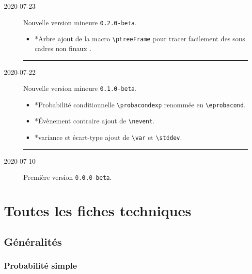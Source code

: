 \documentclass[12pt,a4paper]{article}
\makeatletter
\newcommand\env[1]{\texttt{#1}}
\newcommand\macro[1]{\env{\textbackslash{}#1}}
\theoremstyle{definition}
\newcommand\separation{
	\medskip
	\hfill\rule{0.5\textwidth}{0.75pt}\hfill
	\medskip
}
\newcommand\topic{\@ifstar{\@topic@star}{\@topic@no@star}}
\newcommand\@topic@no@star[1]{%
	\textbf{\textsc{#1}.}%
}
\newcommand\@topic@star[1]{%
	\textbf{\textsc{#1} :}%
}
\makeatother
\begin{document}
\begin{description}
    \medskip
    \item[2020-07-23] Nouvelle version mineure \verb+0.2.0-beta+.
    
    \begin{itemize}[itemsep=.5em]
        \item \topic*{Arbre}
              ajout de la macro \macro{ptreeFrame} pour tracer facilement des sous cadres non \og finaux \fg.
    \end{itemize}
    
    \separation

    \medskip
    \item[2020-07-22] Nouvelle version mineure \verb+0.1.0-beta+.
    
    \begin{itemize}[itemsep=.5em]
        \item \topic*{Probabilité conditionnelle}
              \macro{probacondexp} renommée en  \macro{eprobacond}.
    
        \item \topic*{Évènement contraire}
              ajout de \macro{nevent}.
    
        \item \topic*{variance et écart-type}
              ajout de \macro{var} et \macro{stddev}.
    \end{itemize}
    
    \separation

    \medskip
    \item[2020-07-10] Première version \verb+0.0.0-beta+.

\end{description}


\newpage
\section{Toutes les fiches techniques} \label{techincal-ids}












\subsection{Généralités}

\subsubsection{Probabilité \og simple \fg}
\end{document}
